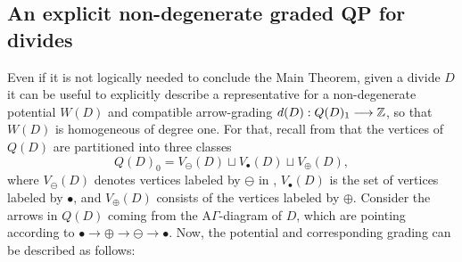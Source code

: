 \subsection{An explicit non-degenerate graded QP for divides} Even if it is not logically needed to conclude the Main Theorem, given a divide $D$ it can be useful to explicitly describe a representative for a non-degenerate potential $W(D)$ and compatible arrow-grading $d(D):Q(D)_1\longrightarrow\mathbb Z$, so that $W(D)$ is homogeneous of degree one. For that, recall from \cite[Definition 4.2]{FPST} that the vertices of $Q(D)$ are partitioned into three classes
\[
 Q(D)_0=V_{\ominus}(D)\sqcup V_{\bullet}(D)\sqcup V_{\oplus}(D),
\]
where $V_\ominus(D)$ denotes vertices labeled by $\ominus$ in \cite[Definition 4.2]{FPST}, $V_{\bullet}(D)$ is the set of vertices labeled by $\bullet$, and $V_\oplus(D)$ consists of the vertices labeled by $\oplus$. Consider the arrows in $Q(D)$ coming from the $\mbox{A}\Gamma$-diagram of $D$, which are pointing according to $\bullet\to\oplus\to\ominus\to\bullet$. Now, the potential and corresponding grading can be described as follows:\\

